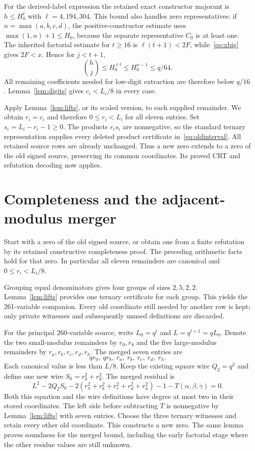 \documentclass[10pt,letterpaper]{article}
\theoremstyle{definition}\newtheorem{definition}[theorem]{Definition}
\begin{document}
For the derived-label expression the retained exact constructor majorant is
$h\le H_0^{\ell}$ with $\ell=4,194,304$. This bound also handles zero
representatives: if $n=\max(a,b,c,d)$, the positive-constructor estimate
uses $\max(1,n)+1\le H_0$, because the separate representative $C_0$ is at
least one. The inherited factorial estimate for $t\ge16$ is
$\ell(t+1)<2F$, while~\eqref{eq:xbig} gives $2F<x$. Hence for $j<t+1$,
\begin{equation}\label{eq:derivedmargin}
 \binom hj\le H_0^{\ell t}\le H_0^{x-1}\le q/64.
\end{equation}
All remaining coefficients needed for low-digit extraction are therefore
below $q/16$. Lemma~\ref{lem:digits} gives $c_i<L_i/8$ in every case.

Apply Lemma~\ref{lem:lifts}, or its scaled version, to each supplied
remainder. We obtain $r_i=c_i$ and therefore $0\le r_i<L_i$ for all eleven
entries. Set $s_i=L_i-r_i-1\ge0$. The products $r_i s_i$ are nonnegative,
so the standard ternary representation supplies every deleted product
certificate in~\eqref{eq:oldinterval}. All retained source rows are already
unchanged. Thus a new zero extends to a zero of the old signed source,
preserving its common coordinates. Its proved CRT and refutation decoding
now applies.

\section{Completeness and the adjacent-modulus merger}

Start with a zero of the old signed source, or obtain one from a finite
refutation by its retained constructive completeness proof. The preceding
arithmetic facts hold for that zero. In particular all eleven remainders
are canonical and $0\le r_i<L_i/8$.

Grouping equal denominators gives four groups of sizes $2,5,2,2$.
Lemma~\ref{lem:lifts} provides one ternary certificate for each group.
This yields the 261-variable companion. Every old coordinate still needed
by another row is kept; only private witnesses and subsequently unused
definitions are discarded.

For the principal 260-variable source, write
$L_0=q^t$ and $L=q^{t+1}=qL_0$. Denote the two small-modulus remainders
by $r_0,r_8$ and the five large-modulus remainders by $r_a,r_b,r_c,r_d,r_h$.
The merged seven entries are
\[
 qr_0,\ qr_8,\ r_a,\ r_b,\ r_c,\ r_d,\ r_h.
\]
Each canonical value is less than $L/8$. Keep the existing square wire
$Q_2=q^2$ and define one new wire
$S_0=r_0^2+r_8^2$. The merged residual is
\begin{equation}\label{eq:merged}
 L^2-2Q_2S_0-2(r_a^2+r_b^2+r_c^2+r_d^2+r_h^2)-1
        -T(\alpha,\beta,\gamma)=0.
\end{equation}
Both this equation and the wire definitions have degree at most two in
their stored coordinates. The left side before subtracting $T$ is
nonnegative by Lemma~\ref{lem:lifts} with seven entries. Choose the three
ternary witnesses and retain every other old coordinate. This constructs
a new zero. The same lemma proves soundness for the merged bound, including
the early factorial stage where the other residue values are still unknown.
\end{document}
